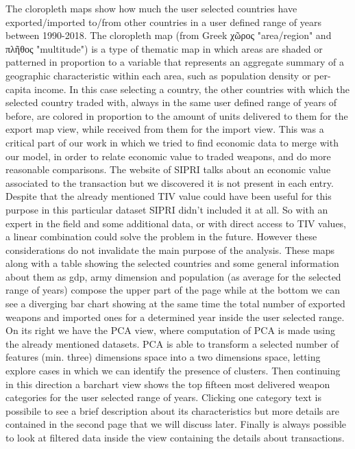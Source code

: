 \documentclass{article}
\begin{document}
\begin{multicols}{2}
The cloropleth maps show how much the user selected countries have exported/imported to/from other countries in a user defined range of years between 1990-2018. The cloropleth map (from Greek χῶρος "area/region" and πλῆθος "multitude") is a type of thematic map in which areas are shaded or patterned in proportion to a variable that represents an aggregate summary of a geographic characteristic within each area, such as population density or per-capita income. In this case selecting a country, the other countries with which the selected country traded with, always in the same user defined range of years of before, are colored in proportion to the amount of units delivered  to them for the export map view, while received from them for the import view.
This was a critical part of our work in which we tried to find economic data to merge with our model, in order to relate economic value to traded weapons, and do more reasonable comparisons. The website of SIPRI talks about an economic value associated to the transaction but we discovered it is not present in each entry. Despite that the already mentioned TIV value could have been useful for this purpose in this particular dataset SIPRI didn’t included it at all. So with an expert in the field and some additional data, or with direct access to TIV values, a linear combination could solve the problem in the future. However these considerations do not invalidate the main purpose of the analysis.
These maps along with a table showing the selected countries and some general information about them as gdp, army dimension and population (as average for the selected range of years) compose the upper part of the page while at the bottom we can see a diverging bar chart showing at the same time the total number of exported weapons and imported ones for a determined year inside the user selected range. 
On its right we have the PCA view, where computation of PCA is made using the already mentioned datasets. PCA is able to transform a selected number of features (min. three) dimensions space into a two dimensions space, letting explore cases in which we can identify the presence of clusters. Then continuing in this direction a barchart view shows the top fifteen most delivered weapon categories for the user selected range of years. Clicking one category text is possibile to see a brief description about its characteristics but more details are contained in the second page that we will discuss later. Finally is always possible to look at filtered data inside the view containing the details about transactions.


\end{multicols}
\end{document}
